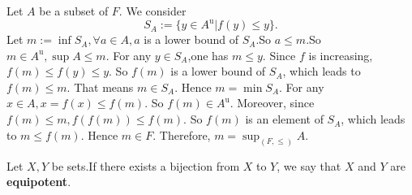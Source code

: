 \documentclass{book}
\numberwithin{equation}{section}
\begin{document}
\begin{proofenv}
    Let $A$ be a subset of $F$. We consider 
    $$S_A:=\{y\in A^\mathrm{u}|f(y)\le y\}.$$
    Let $m:=\inf S_A,\forall a\in A,a$ is a lower bound of $S_A$.So $a\le m$.So $m\in A^\mathrm{u},\sup A\le m$. For any $y\in S_A$,one has $m\le y$. Since $f$ is increasing, $f(m)\le f(y)\le y$. So $f(m)$ is a lower bound of $S_A$, which leads to $f(m)\le m$. That means $m\in S_A$. Hence $m=\min S_A$. For any $x\in A,x=f(x)\le f(m)$. So $f(m)\in A^\mathrm{u}$. Moreover, since $f(m)\le m ,f(f(m))\le f(m)$. So $f(m)$ is an element of $S_A$, which leads to $m\le f(m)$. Hence $m\in F$. Therefore, $m=\sup_{(F,\le)}A$.
\end{proofenv}
\begin{definitionenv}
    Let $X,Y$ be sets.If there exists a bijection from $X$ to $Y$, we say that $X$ and $Y$ are \textbf{equipotent}.
\end{definitionenv}
\end{document}
